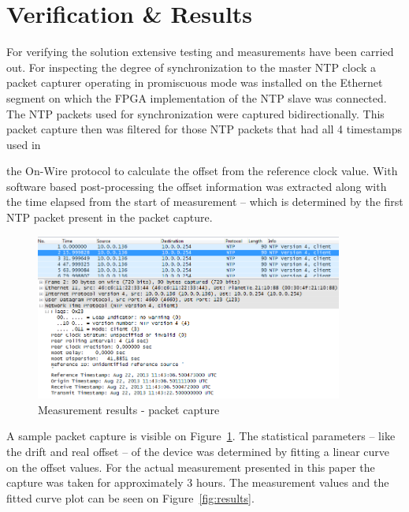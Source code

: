 \documentclass[journal]{IEEEtran}
\begin{document}
\section{Verification \& Results}


For verifying the solution extensive testing and measurements have been carried out. For inspecting the degree of
synchronization to the master NTP clock a packet capturer operating in promiscuous mode was installed on the Ethernet
segment on which the FPGA implementation of the NTP slave was connected. The NTP packets used for synchronization were
captured bidirectionally. This packet capture then was filtered for those NTP packets that had all 4 timestamps used in

the On-Wire protocol to calculate the offset from the reference clock value. With software based post-processing the
offset information was extracted along with the time elapsed from the start of measurement -- which is determined by
the
first NTP packet present in the packet capture.

\begin{figure}[!htb]
    \centering
    \includegraphics[width=0.9\textwidth]{figures_raw/pcap-NTP.png}
    \caption{Measurement results - packet capture}
    \label{fig:pcap-NTP}
\end{figure}

A sample packet capture is visible on Figure~\ref{fig:pcap-NTP}. The statistical parameters -- like the drift and real
offset -- of the device was determined by
fitting a linear curve on the offset values. For the actual measurement presented in this paper the capture was taken
for approximately 3 hours.
The measurement values and the fitted curve plot can be seen on Figure~\ref{fig:results}.
\end{document}
